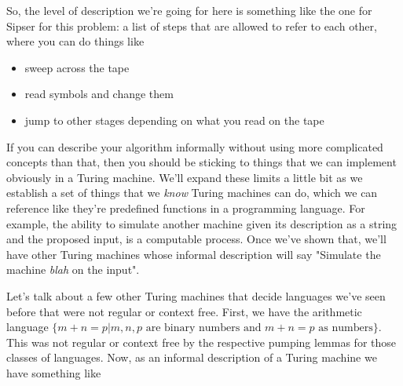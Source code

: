 \documentclass[11pt]{article}
\begin{document}
So, the level of description we're going for here is something like the one for Sipser for this problem: a list of steps that are allowed to refer to each other, where you can do things like 

\begin{itemize}
\item sweep across the tape
\item read symbols and change them
\item jump to other stages depending on what you read on the tape
\end{itemize}

If you can describe your algorithm informally without using more complicated concepts than that, then you should be sticking to things that we can implement obviously in a Turing machine. We'll expand these limits a little bit as we establish a set of things that we \emph{know} Turing machines can do, which we can reference like they're predefined functions in a programming language. For example, the ability to simulate another machine given its description as a string and the proposed input, is a computable process. Once we've shown that, we'll have other Turing machines whose informal description will say "Simulate the machine \emph{blah} on the input". 

Let's talk about a few other Turing machines that decide languages we've seen before that were not regular or context free. First, we have the arithmetic language $\{m+n=p | m,n,p \text{ are binary numbers and } m+n=p \text{ as numbers}\}$. This was not regular or context free by the respective pumping lemmas for those classes of languages. Now, as an informal description of a Turing machine we have something like
\end{document}
